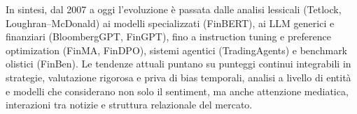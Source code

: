 In sintesi, dal 2007 a oggi l'evoluzione è passata dalle analisi lessicali (Tetlock, Loughran--McDonald) ai modelli specializzati (FinBERT), ai LLM generici e finanziari (BloombergGPT, FinGPT), fino a instruction tuning e preference optimization (FinMA, FinDPO), sistemi agentici (TradingAgents) e benchmark olistici (FinBen).
Le tendenze attuali puntano su punteggi continui integrabili in strategie, valutazione rigorosa e priva di bias temporali, analisi a livello di entità e modelli che considerano non solo il sentiment, ma anche attenzione mediatica, interazioni tra notizie e struttura relazionale del mercato.
